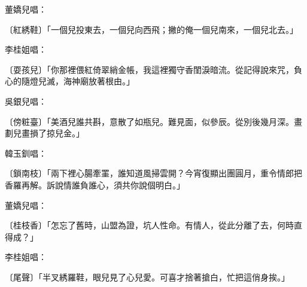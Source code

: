 董嬌兒唱：

〔紅綉鞋〕「一個兒投東去，一個兒向西飛；撇的俺一個兒南來，一個兒北去。」

李桂姐唱：

〔耍孩兒〕「你那裡偎紅倚翠綃金帳，我這裡獨守香閨淚暗流。從記得說來咒，負心的隨燈兒滅，海神廟放著根由。」

吳銀兒唱：

〔傍粧臺〕「美酒兒誰共斟，意散了如瓶兒。難見面，似參辰。從別後幾月深。畫劃兒畫損了掠兒金。」

韓玉釧唱：

〔鎖南枝〕「兩下裡心腸牽罣，誰知道風掃雲開？今宵復顯出團圓月，重令情郎把香羅再解。訴說情誰負誰心，須共你說個明白。」

董嬌兒唱：

〔桂枝香〕「怎忘了舊時，山盟為證，坑人性命。有情人，從此分離了去，何時直得成？」

李桂姐唱：

〔尾聲〕「半叉綉羅鞋，眼兒見了心兒愛。可喜才捨著搶白，忙把這俏身挨。」

